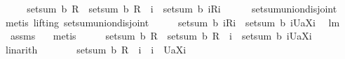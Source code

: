 \begin{isabellebody}
\ \ \isamarkupfalse%
\ \isamarkupfalse%
\ {\isachardoublequoteopen}setsum\ b\ {\isacharquery}R\ {\isacharequal}\ setsum\ b\ {\isacharparenleft}{\isacharquery}R\ {\isacharminus}{\isacharminus}\ i{\isacharparenright}\ {\isacharplus}\ setsum\ b\ {\isacharparenleft}{\isacharbraceleft}i{\isacharbraceright}{\isasymtimes}{\isacharparenleft}{\isacharquery}R{\isacharbackquote}{\isacharbackquote}{\isacharbraceleft}i{\isacharbraceright}{\isacharparenright}{\isacharparenright}{\isachardoublequoteclose}\ \isanewline
\ \ \isamarkupfalse%
\ {}\ setsum{\isachardot}union{\isacharunderscore}disjoint\ \isamarkupfalse%
\ {\isacharparenleft}metis\ {\isacharparenleft}lifting{\isacharparenright}\ setsum{\isachardot}union{\isacharunderscore}disjoint{\isacharparenright}\isanewline
\ \ \isamarkupfalse%
\ \isamarkupfalse%
\ {\isachardoublequoteopen}setsum\ b\ {\isacharparenleft}{\isacharbraceleft}i{\isacharbraceright}{\isasymtimes}{\isacharparenleft}{\isacharquery}R{\isacharbackquote}{\isacharbackquote}{\isacharbraceleft}i{\isacharbraceright}{\isacharparenright}{\isacharparenright}\ {\isasymle}\ setsum\ b\ {\isacharparenleft}{\isacharbraceleft}i{\isacharbraceright}{\isasymtimes}{\isacharbraceleft}{\isacharquery}U{\isacharparenleft}a{\isacharbackquote}{\isacharbackquote}{\isacharparenleft}X{\isasymunion}{\isacharbraceleft}i{\isacharbraceright}{\isacharparenright}{\isacharparenright}{\isacharbraceright}{\isacharparenright}{\isachardoublequoteclose}\ \isamarkupfalse%
\ lm{}{}\ \isanewline
\ \ assms{\isacharparenleft}{}{\isacharparenright}\ {}\ \isamarkupfalse%
\ metis\isanewline
\ \ \isamarkupfalse%
\ \isamarkupfalse%
\ {\isachardoublequoteopen}setsum\ b\ {\isacharquery}R\ {\isasymle}\ setsum\ b\ {\isacharparenleft}{\isacharquery}R\ {\isacharminus}{\isacharminus}\ i{\isacharparenright}\ {\isacharplus}\ setsum\ b\ {\isacharparenleft}{\isacharbraceleft}i{\isacharbraceright}{\isasymtimes}{\isacharbraceleft}{\isacharquery}U{\isacharparenleft}a{\isacharbackquote}{\isacharbackquote}{\isacharparenleft}X{\isasymunion}{\isacharbraceleft}i{\isacharbraceright}{\isacharparenright}{\isacharparenright}{\isacharbraceright}{\isacharparenright}{\isachardoublequoteclose}\ \isamarkupfalse%
\ linarith\isanewline
\ \ \isamarkupfalse%
\ \isamarkupfalse%
\ {\isachardoublequoteopen}{\isachardot}{\isachardot}{\isachardot}\ {\isacharequal}\ setsum\ b\ {\isacharparenleft}{\isacharquery}R\ {\isacharminus}{\isacharminus}\ i\ {\isasymunion}\ {\isacharparenleft}{\isacharbraceleft}i{\isacharbraceright}\ {\isasymtimes}\ {\isacharbraceleft}{\isacharquery}U{\isacharparenleft}a{\isacharbackquote}{\isacharbackquote}{\isacharparenleft}X{\isasymunion}{\isacharbraceleft}i{\isacharbraceright}{\isacharparenright}{\isacharparenright}{\isacharbraceright}{\isacharparenright}{\isacharparenright}{\isachardoublequoteclose}\ \isanewline

\end{isabellebody}
